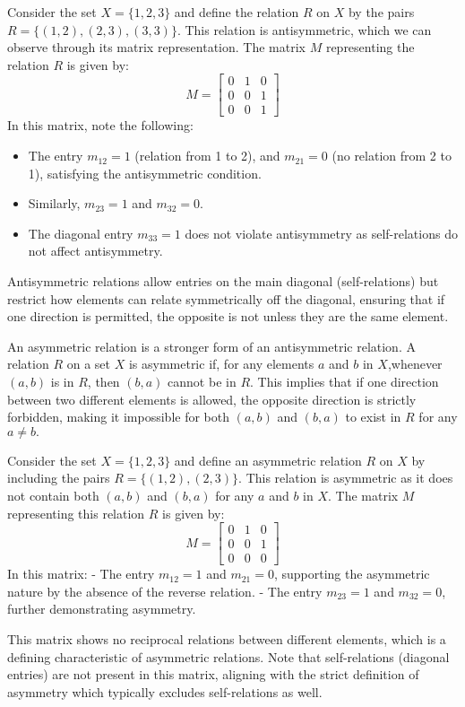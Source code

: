 	\begin{example}[Antisymmetry]
		Consider the set \( X = \{1, 2, 3\} \) and define the relation \( R \) on \( X \) by the pairs \( R = \{(1, 2), (2, 3), (3, 3)\} \). This relation is antisymmetric, which we can observe through its matrix representation. The matrix \( M \) representing the relation \( R \) is given by:
		$$
		M = \begin{bmatrix}
			0 & 1 & 0 \\
			0 & 0 & 1 \\
			0 & 0 & 1
		\end{bmatrix}
		$$
		In this matrix, note the following:
		\begin{itemize}
		\item The entry \( m_{12} = 1 \) (relation from 1 to 2), and \( m_{21} = 0 \) (no relation from 2 to 1), satisfying the antisymmetric condition.
		\item Similarly, \( m_{23} = 1 \) and \( m_{32} = 0 \).
		\item The diagonal entry \( m_{33} = 1 \) does not violate antisymmetry as self-relations do not affect antisymmetry.
		\end{itemize}
		Antisymmetric relations allow entries on the main diagonal (self-relations) but restrict how elements can relate symmetrically off the diagonal, ensuring that if one direction is permitted, the opposite is not unless they are the same element.
	\end{example}
	An asymmetric relation is a stronger form of an antisymmetric relation. A relation $R$ on a set $X$ is asymmetric if, for any elements $a$ and $b$ in $X$,whenever $(a,b)$ is in $R$, then $(b,a)$ cannot be in $R$. This implies that if one direction between two different elements is allowed, the opposite direction is strictly forbidden, making it impossible for both $(a,b)$ and $(b,a)$ to exist in $R$ for any $a\neq b.$
	\begin{example}[Asymmetry]
		Consider the set \( X = \{1, 2, 3\} \) and define an asymmetric relation \( R \) on \( X \) by including the pairs \( R = \{(1, 2), (2, 3)\} \). This relation is asymmetric as it does not contain both \( (a, b) \) and \( (b, a) \) for any \( a \) and \( b \) in \( X \). The matrix \( M \) representing this relation \( R \) is given by:
		$$
		M = \begin{bmatrix}
			0 & 1 & 0 \\
			0 & 0 & 1 \\
			0 & 0 & 0
		\end{bmatrix}
		$$
		In this matrix:
		- The entry \( m_{12} = 1 \) and \( m_{21} = 0 \), supporting the asymmetric nature by the absence of the reverse relation.
		- The entry \( m_{23} = 1 \) and \( m_{32} = 0 \), further demonstrating asymmetry.
		
		This matrix shows no reciprocal relations between different elements, which is a defining characteristic of asymmetric relations. Note that self-relations (diagonal entries) are not present in this matrix, aligning with the strict definition of asymmetry which typically excludes self-relations as well.
	\end{example}
